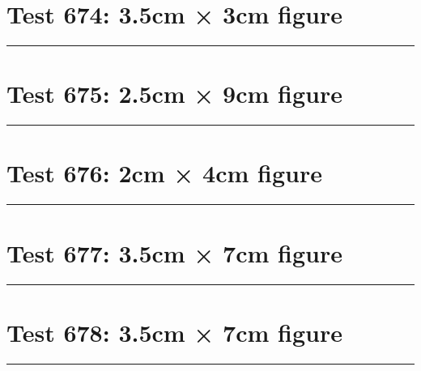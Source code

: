 \documentclass[a4paper,11pt]{article}
\begin{document}
\section*{Test 674: 3.5cm × 3cm figure}
\begin{swarmwrap}%
  \begin{minipage}[t]{3cm}
    \centering
    \rule{\linewidth}{3cm}
  \end{minipage}%
\end{swarmwrap}%
\swarmwrapnext
\lipsum[66]
\lipsum[67]
\lipsum[68]
\lipsum[69]
\lipsum[70]
\section*{Test 675: 2.5cm × 9cm figure}
\begin{swarmwrap}%
  \begin{minipage}[t]{2cm}
    \centering
    \rule{\linewidth}{9cm}
  \end{minipage}%
\end{swarmwrap}%
\swarmwrapnext
\lipsum[119]
\lipsum[120]
\lipsum[121]
\lipsum[122]
\section*{Test 676: 2cm × 4cm figure}
\begin{swarmwrap}%
  \begin{minipage}[t]{2cm}
    \centering
    \rule{\linewidth}{4cm}
  \end{minipage}%
\end{swarmwrap}%
\swarmwrapnext
\lipsum[3]
\lipsum[4]
\lipsum[5]
\lipsum[6]
\lipsum[7]
\section*{Test 677: 3.5cm × 7cm figure}
\begin{swarmwrap}%
  \begin{minipage}[t]{3cm}
    \centering
    \rule{\linewidth}{7cm}
  \end{minipage}%
\end{swarmwrap}%
\swarmwrapnext
\lipsum[86]
\lipsum[87]
\lipsum[88]
\lipsum[89]
\lipsum[90]
\lipsum[91]
\section*{Test 678: 3.5cm × 7cm figure}
\begin{swarmwrap}%
  \begin{minipage}[t]{3cm}
    \centering
    \rule{\linewidth}{7cm}
  \end{minipage}%
\end{swarmwrap}%
\swarmwrapnext
\lipsum[36]
\lipsum[37]
\lipsum[38]
\lipsum[39]
\lipsum[40]
\lipsum[41]
\end{document}

